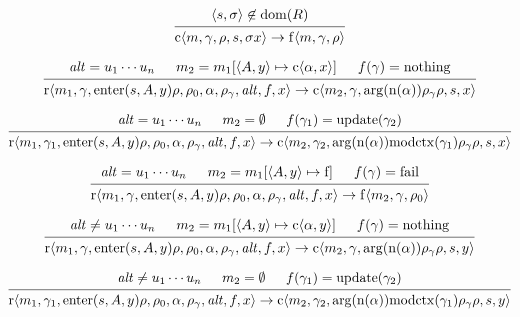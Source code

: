 \documentclass[12pt]{article}
\begin{document}
\[
  \begin{prooftree}
    \hypo{\langle s, \sigma\rangle \not\in \mathrm{dom}(R)}
    \infer1{\mathrm{c}\langle m, \gamma, \rho, s, \sigma x\rangle \to \mathrm{f}\langle m, \gamma, \rho\rangle}
  \end{prooftree}
\]

\[
  \begin{prooftree}
    \hypo{\mathit{alt} = u_1 \cdots u_n}
    \hypo{m_2 = m_1[\langle A, y\rangle \mapsto \mathrm{c}\langle \alpha, x\rangle]}
    \hypo{f(\gamma) = \mathrm{nothing}}
    \infer3{\mathrm{r}\langle m_1, \gamma, \mathrm{enter}(s, A, y) \rho, \rho_0, \alpha, \rho_\gamma, \mathit{alt}, f, x\rangle \to \mathrm{c}\langle m_2, \gamma, \mathrm{arg}(\mathrm{n}(\alpha)) \rho_\gamma \rho, s, x\rangle}
  \end{prooftree}
\]

\[
  \begin{prooftree}
    \hypo{\mathit{alt} = u_1 \cdots u_n}
    \hypo{m_2 = \emptyset}
    \hypo{f(\gamma_1) = \mathrm{update}(\gamma_2)}
    \infer3{\mathrm{r}\langle m_1, \gamma_1, \mathrm{enter}(s, A, y) \rho, \rho_0, \alpha, \rho_\gamma, \mathit{alt}, f, x\rangle \to \mathrm{c}\langle m_2, \gamma_2, \mathrm{arg}(\mathrm{n}(\alpha)) \mathrm{modctx}(\gamma_1) \rho_\gamma \rho, s, x\rangle}
  \end{prooftree}
\]

\[
  \begin{prooftree}
    \hypo{\mathit{alt} = u_1 \cdots u_n}
    \hypo{m_2 = m_1[\langle A, y\rangle \mapsto \mathrm{f}]}
    \hypo{f(\gamma) = \mathrm{fail}}
    \infer3{\mathrm{r}\langle m_1, \gamma, \mathrm{enter}(s, A, y) \rho, \rho_0, \alpha, \rho_\gamma, \mathit{alt}, f, x\rangle \to \mathrm{f}\langle m_2, \gamma, \rho_0\rangle}
  \end{prooftree}
\]

\[
  \begin{prooftree}
    \hypo{\mathit{alt} \neq u_1 \cdots u_n}
    \hypo{m_2 = m_1[\langle A, y\rangle \mapsto \mathrm{c}\langle \alpha, y\rangle]}
    \hypo{f(\gamma) = \mathrm{nothing}}
    \infer3{\mathrm{r}\langle m_1, \gamma, \mathrm{enter}(s, A, y) \rho, \rho_0, \alpha, \rho_\gamma, \mathit{alt}, f, x\rangle \to \mathrm{c}\langle m_2, \gamma, \mathrm{arg}(\mathrm{n}(\alpha)) \rho_\gamma \rho, s, y\rangle}
  \end{prooftree}
\]

\[
  \begin{prooftree}
    \hypo{\mathit{alt} \neq u_1 \cdots u_n}
    \hypo{m_2 = \emptyset}
    \hypo{f(\gamma_1) = \mathrm{update}(\gamma_2)}
    \infer3{\mathrm{r}\langle m_1, \gamma_1, \mathrm{enter}(s, A, y) \rho, \rho_0, \alpha, \rho_\gamma, \mathit{alt}, f, x\rangle \to \mathrm{c}\langle m_2, \gamma_2, \mathrm{arg}(\mathrm{n}(\alpha)) \mathrm{modctx}(\gamma_1) \rho_\gamma \rho, s, y\rangle}
  \end{prooftree}
\]
\end{document}
